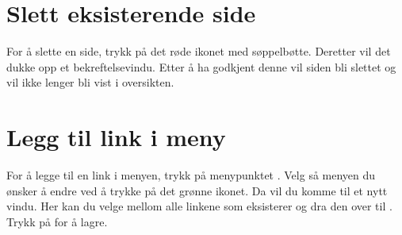 \begin{figure}[H]
    \centering
    \label{fig:cms-fill-information}
\end{figure}

\section{Slett eksisterende side}
For å slette en side, trykk på det røde ikonet med søppelbøtte. Deretter vil det dukke opp et bekreftelsevindu. Etter å ha godkjent denne vil siden bli slettet og vil ikke lenger bli vist i oversikten.

\begin{figure}[H]
    \centering
    \label{fig:cms-delete-page}
\end{figure}


\section{Legg til link i meny}
For å legge til en link i menyen, trykk på menypunktet . Velg så menyen du ønsker å endre ved å trykke på det grønne ikonet. Da vil du komme til et nytt vindu. Her kan du velge mellom alle linkene som eksisterer og dra den over til . Trykk på  for å lagre.

\begin{figure}[H]
    \centering
    \label{fig:cms-menu}
\end{figure}


